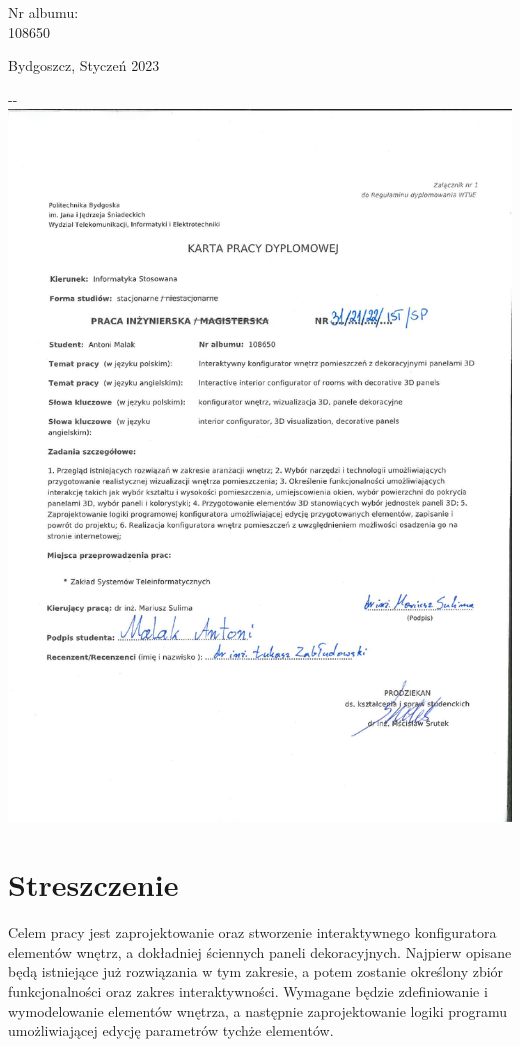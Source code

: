 \documentclass{article} %
\begin{document}
\begin{minipage}{2in}
Nr albumu: \\
108650
\end{minipage}

\begin{center}
 Bydgoszcz, Styczeń 2023
\end{center}

\pagestyle{fancy}

\begin{adjustwidth}{-\oddsidemargin-1in}{-\rightmargin}
\centering
\includegraphics[width=\paperwidth,angle=0.3,trim={0 0 1cm 3cm},clip]{Załączniki/karta_pracy_skan.png}
\end{adjustwidth}
\newpage


\section*{Streszczenie}
Celem pracy jest zaprojektowanie oraz stworzenie interaktywnego konfiguratora elementów wnętrz, a dokładniej ściennych paneli dekoracyjnych. Najpierw opisane będą istniejące już rozwiązania w tym zakresie, a potem zostanie określony zbiór funkcjonalności oraz zakres interaktywności. Wymagane będzie zdefiniowanie i wymodelowanie elementów wnętrza, a następnie zaprojektowanie logiki programu umożliwiającej edycję parametrów tychże elementów.
\\
\end{document}
